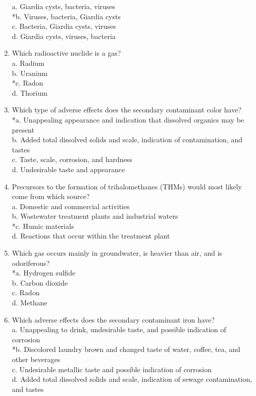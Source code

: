 \begin{enumerate}[1.]
a.	Giardia cysts, bacteria, viruses\\
*b.	Viruses, bacteria, Giardia cysts\\
c.	Bacteria, Giardia cysts, viruses\\
d.	Giardia cysts, viruses, bacteria\\
\item Which radioactive nuclide is a gas?\\
a. Radium\\
b. Uranium\\
*c. Radon\\
d. Thorium
\item Which type of adverse effects does the secondary contaminant color have?\\
*a. Unappealing appearance and indication that dissolved organics may be present\\
b. Added total dissolved solids and scale, indication of contamination, and tastes\\
c. Taste, scale, corrosion, and hardness\\
d. Undesirable taste and appearance\\
\item Precursors to the formation of trihalomethanes (THMs) would most likely come from which source?\\
a. Domestic and commercial activities\\
b. Wastewater treatment plants and industrial waters\\
*c. Humic materials\\
d. Reactions that occur within the treatment plant
\item Which gas occurs mainly in groundwater, is heavier than air, and is odoriferous?\\
*a. Hydrogen sulfide\\
b. Carbon dioxide\\
c. Radon\\
d. Methane\\
\item Which adverse effects does the secondary contaminant iron have?\\
a. Unappealing to drink, undesirable taste, and possible indication of corrosion\\
*b. Discolored laundry brown and changed taste of water, coffee, tea, and other beverages\\
c. Undesirable metallic taste and possible indication of corrosion\\
d. Added total dissolved solids and scale, indication of sewage contamination, and tastes

\end{enumerate}
